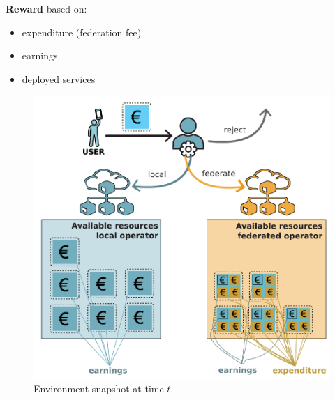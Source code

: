 \documentclass[aspectratio=169]{beamer}
\begin{document}
\begin{frame}
    \frametitle{\secname}
    \framesubtitle{\subsecname}


    \begin{minipage}{.45\textwidth}
        \textbf{Reward} based on:
        \begin{itemize}
            \item expenditure (federation fee)
            \item earnings
            \item deployed services
        \end{itemize}
    \end{minipage}
    \begin{minipage}{.5\textwidth}
    \begin{figure}
        \centering
        \includegraphics[width=.9\textwidth]{img/available}
        \caption{Environment snapshot at time $t$.}
        \label{fig:earnings-actions}
    \end{figure}
    \end{minipage}
\end{frame}
\end{document}

